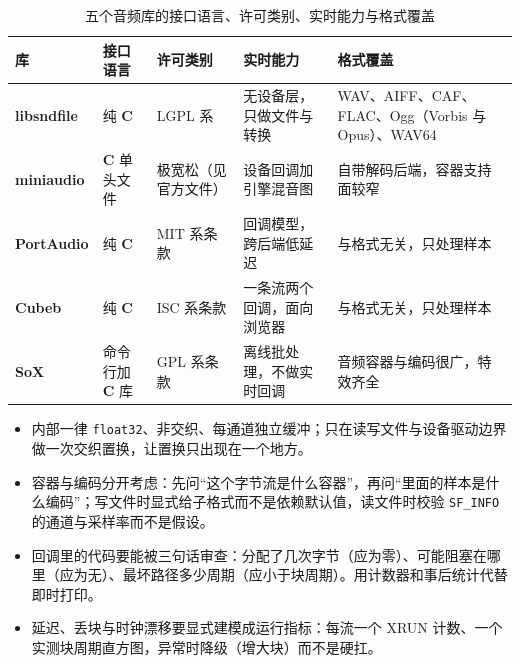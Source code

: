\documentclass[12pt,a4paper,fontset=fandol]{ctexbook}
\newcommand{\Tp}[1]{\texttt{#1}}
\newcommand{\Lib}[1]{\textbf{#1}}
\newcommand{\Lang}[1]{\textsf{\bfseries #1}}
\newcommand{\CL}{\Lang{C}}
\begin{document}
\begin{table}[H]
\centering
\caption{五个音频库的接口语言、许可类别、实时能力与格式覆盖}
\label{tab:ch11-audio}
\small
\begin{tabular}{@{}>{\raggedright\arraybackslash}p{}
  >{\raggedright\arraybackslash}p{}
  >{\raggedright\arraybackslash}p{}
  >{\raggedright\arraybackslash}p{}
  >{\raggedright\arraybackslash}p{}@{}}
\toprule
库 & 接口语言 & 许可类别 & 实时能力 & 格式覆盖 \\
\midrule
\Lib{libsndfile} & 纯 \CL{} & LGPL 系 &
  无设备层，只做文件与转换 &
  WAV、AIFF、CAF、FLAC、Ogg（Vorbis 与 Opus）、WAV64 \\
\Lib{miniaudio} & \CL{} 单头文件 & 极宽松（见官方文件） &
  设备回调加引擎混音图 & 自带解码后端，容器支持面较窄 \\
\Lib{PortAudio} & 纯 \CL{} & MIT 系条款 &
  回调模型，跨后端低延迟 & 与格式无关，只处理样本 \\
\Lib{Cubeb} & 纯 \CL{} & ISC 系条款 &
  一条流两个回调，面向浏览器 & 与格式无关，只处理样本 \\
\Lib{SoX} & 命令行加 \CL{} 库 & GPL 系条款 &
  离线批处理，不做实时回调 & 音频容器与编码很广，特效齐全 \\
\bottomrule
\end{tabular}
\end{table}

\begin{bestpractice}[title={表示层与回调的四条纪律}]
\begin{itemize}
\item 内部一律 \Tp{float32}、非交织、每通道独立缓冲；只在读写文件与设备驱动边界做一次交织置换，让置换只出现在一个地方。
\item 容器与编码分开考虑：先问``这个字节流是什么容器''，再问``里面的样本是什么编码''；写文件时显式给子格式而不是依赖默认值，读文件时校验 \Tp{SF\_INFO} 的通道与采样率而不是假设。
\item 回调里的代码要能被三句话审查：分配了几次字节（应为零）、可能阻塞在哪里（应为无）、最坏路径多少周期（应小于块周期）。用计数器和事后统计代替即时打印。
\item 延迟、丢块与时钟漂移要显式建模成运行指标：每流一个 XRUN 计数、一个实测块周期直方图，异常时降级（增大块）而不是硬扛。
\end{itemize}
\end{bestpractice}

\end{document}
